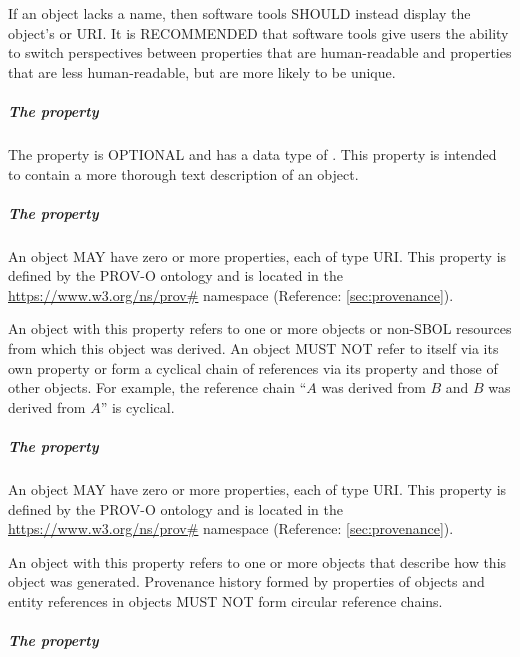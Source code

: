 If an  object lacks a name, then software tools SHOULD instead display the object's  or URI.
It is RECOMMENDED that software tools give users the ability to switch perspectives between  properties that are human-readable and  properties that are less human-readable, but are more likely to be unique.

\subparagraph{The  property}
\label{sec:description}

The  property is OPTIONAL and has a data type of . This property is intended to contain a more thorough text description of an  object.

\subparagraph{The  property}
\label{sec:prov:wasDerivedFrom}
An  object MAY have zero or more  properties, each of type URI. This property is defined by the PROV-O ontology and is located in the \url{https://www.w3.org/ns/prov#} namespace (Reference: \ref{sec:provenance}).

 An  object with this property refers to one or more  objects or non-SBOL resources from which this object was derived. An  object MUST NOT refer to itself via its own  property or form a cyclical chain of references via its  property and those of other  objects. For example, the reference chain ``$A$ was derived from $B$ and $B$ was derived from $A$'' is cyclical.

\subparagraph{The  property}
\label{sec:prov:wasGeneratedBy}
An  object MAY have zero or more  properties, each of type URI. This property is defined by the PROV-O ontology and is located in the \url{https://www.w3.org/ns/prov#} namespace (Reference: \ref{sec:provenance}).

An  object with this property refers to one or more  objects that describe how this object was generated.
Provenance history formed by  properties of  objects and entity references in  objects MUST NOT form circular reference chains.

\subparagraph{The  property}
\label{sec:hasMeasure}

